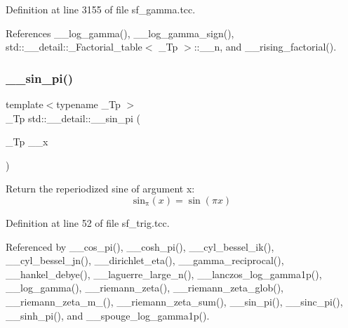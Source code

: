Definition at line 3155 of file sf\+\_\+gamma.\+tcc.



References \+\_\+\+\_\+log\+\_\+gamma(), \+\_\+\+\_\+log\+\_\+gamma\+\_\+sign(), std\+::\+\_\+\+\_\+detail\+::\+\_\+\+Factorial\+\_\+table$<$ \+\_\+\+Tp $>$\+::\+\_\+\+\_\+n, and \+\_\+\+\_\+rising\+\_\+factorial().

\mbox{\label{namespacestd_1_1____detail_a763249defff6377195818c2fc6e7bca2}} 
\subsubsection{\texorpdfstring{\+\_\+\+\_\+sin\+\_\+pi()}{\_\_sin\_pi()}\hspace{0.1cm}{\footnotesize\ttfamily [1/2]}}
{\footnotesize\ttfamily template$<$typename \+\_\+\+Tp $>$ \\
\+\_\+\+Tp std\+::\+\_\+\+\_\+detail\+::\+\_\+\+\_\+sin\+\_\+pi (\begin{DoxyParamCaption}\item[{\+\_\+\+Tp}]{\+\_\+\+\_\+x }\end{DoxyParamCaption})}

Return the reperiodized sine of argument x\+: \[ \mathrm{sin_\pi}(x) = \sin(\pi x) \] 

Definition at line 52 of file sf\+\_\+trig.\+tcc.



Referenced by \+\_\+\+\_\+cos\+\_\+pi(), \+\_\+\+\_\+cosh\+\_\+pi(), \+\_\+\+\_\+cyl\+\_\+bessel\+\_\+ik(), \+\_\+\+\_\+cyl\+\_\+bessel\+\_\+jn(), \+\_\+\+\_\+dirichlet\+\_\+eta(), \+\_\+\+\_\+gamma\+\_\+reciprocal(), \+\_\+\+\_\+hankel\+\_\+debye(), \+\_\+\+\_\+laguerre\+\_\+large\+\_\+n(), \+\_\+\+\_\+lanczos\+\_\+log\+\_\+gamma1p(), \+\_\+\+\_\+log\+\_\+gamma(), \+\_\+\+\_\+riemann\+\_\+zeta(), \+\_\+\+\_\+riemann\+\_\+zeta\+\_\+glob(), \+\_\+\+\_\+riemann\+\_\+zeta\+\_\+m\+\_(), \+\_\+\+\_\+riemann\+\_\+zeta\+\_\+sum(), \+\_\+\+\_\+sin\+\_\+pi(), \+\_\+\+\_\+sinc\+\_\+pi(), \+\_\+\+\_\+sinh\+\_\+pi(), and \+\_\+\+\_\+spouge\+\_\+log\+\_\+gamma1p().

\mbox{\label{namespacestd_1_1____detail_a5f26e85b3d646e5c69be173baebd4185}} 
